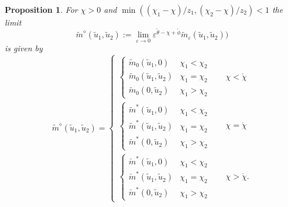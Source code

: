 \documentclass[12pt]{article}
\newtheorem{proposition}[theorem]{Proposition}
\begin{document}
\begin{proposition}
\label{Prop:2}
For  $\chi>0$ and $\min{((\chi_1-\chi)/z_1,(\chi_2-\chi)/z_2)} < 1$ the limit
\begin{equation}
\tilde{m}^{\diamond}(\tilde{u}_1,\tilde{u}_2) 
:=  \lim_{\varepsilon \to 0} \varepsilon^{\mathring{\theta}-\chi+\mathring{\phi}} \tilde{m}_{\varepsilon}(\tilde{u}_1,\tilde{u}_2) 
\label{tmbulldef})
\end{equation}
is given by
\begin{equation}
\tilde{m}^{\diamond}(\tilde{u}_1,\tilde{u}_2)
= \left\{
\begin{array}{ll}
\left\{\begin{array}{ll}
\tilde{m}_{0}(\tilde{u}_1,0)
& \chi_1 < \chi_2 \\
\tilde{m}_{0}(\tilde{u}_1,\tilde{u}_2)
& \chi_1 = \chi_2 \\
\tilde{m}_{0}(0,\tilde{u}_2)
& \chi_1 > \chi_2  
\end{array}
\right. & \quad \chi < \mathring{\chi} 
\\[6mm]
\left\{
\begin{array}{ll}
\tilde{m}^\ast
(\tilde{u}_1,0) & \chi_1 < \chi_2\\
\tilde{m}^\ast
(\tilde{u}_1,\tilde{u}_2) & \chi_1 = \chi_2 \\
\tilde{m}^\ast
(0,\tilde{u}_2) & \chi_1 > \chi_2
\end{array} \right. & \quad \chi = \mathring{\chi}  \\[6mm]
\left\{
\begin{array}{ll}
\check{m}^\ast
(\tilde{u}_1,0) & \chi_1 < \chi_2 \\
\check{m}^\ast
(\tilde{u}_1,\tilde{u}_2) & \chi_1 = \chi_2 \\
\check{m}^\ast
(0,\tilde{u}_2) & \chi_1 > \chi_2 
\end{array} \right.  & \quad \chi > \mathring{\chi}.
\end{array} \right. 
\label{mbull}
\end{equation}
\end{proposition}
\end{document}
